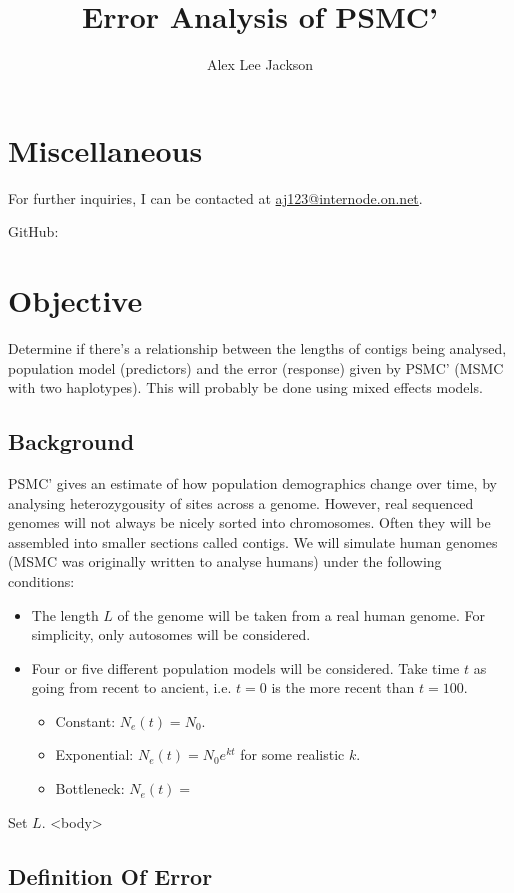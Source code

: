 \documentclass[11pt,a4paper]{article}
\title{Error Analysis of PSMC'}
\author{Alex Lee Jackson}
\begin{document}
\maketitle

%
\section{Miscellaneous}
For further inquiries, I can be contacted at \href{mailto:aj123@internode.on.net}{aj123@internode.on.net}.

GitHub: 

\section{Objective}
Determine if there's a relationship between the lengths of contigs being analysed, population model (predictors) and the error (response) given by PSMC' (MSMC\cite{schiffels2014inferring} with two haplotypes). This will probably be done using mixed effects models.

\subsection{Background}
PSMC' gives an estimate of how population demographics change over time, by analysing heterozygousity of sites across a genome. However, real sequenced genomes will not always be nicely sorted into chromosomes. Often they will be assembled into smaller sections called contigs. We will simulate human genomes (MSMC was originally written to analyse humans) under the following conditions:
\begin{itemize}
\item The length $L$ of the genome will be taken from a real human genome. For simplicity, only autosomes will be considered.
\item Four or five different population models will be considered. Take time $t$ as going from recent to ancient, i.e. $t=0$ is the more recent than $t=100$.
\begin{itemize}
\item Constant: $N_e(t)=N_0$.
\item Exponential: $N_e(t)=N_0e^{kt}$ for some realistic $k$.
\item Bottleneck: $N_e(t)=$
\end{itemize}
\end{itemize}

\begin{algorithmic}
\State Set $L$.
<body>
\EndFor
\end{algorithmic}
\subsection{Definition Of Error}



{}
\end{document}
